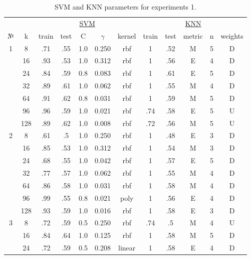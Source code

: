 \begin{table}
\centering
\caption{SVM and KNN parameters for experiments 1.}
\label{tab:params_1_svm_knn}
\begin{tabular}{|c|c|ccccc||ccccc|}\hline
& & \multicolumn{5}{c||}{\underline{SVM}} & \multicolumn{5}{c|}{\underline{KNN}}\\
№ &   k & train & test &   C & $\gamma$ & kernel & train & test & metric & n & weights \\\hline
1 &   8 &   .71 &  .55 & 1.0 &    0.250 &    rbf &     1 &  .52 &      M & 5 &       D \\
  &  16 &   .93 &  .53 & 1.0 &    0.312 &    rbf &     1 &  .56 &      E & 4 &       D \\
  &  24 &   .84 &  .59 & 0.8 &    0.083 &    rbf &     1 &  .61 &      E & 5 &       D \\
  &  32 &   .89 &  .61 & 1.0 &    0.062 &    rbf &     1 &  .55 &      M & 4 &       D \\
  &  64 &   .91 &  .62 & 0.8 &    0.031 &    rbf &     1 &  .59 &      M & 5 &       D \\
  &  96 &   .96 &  .59 & 1.0 &    0.021 &    rbf &   .74 &  .58 &      E & 5 &       U \\
  & 128 &   .89 &  .62 & 1.0 &    0.008 &    rbf &   .72 &  .56 &      M & 5 &       U \\\hline
2 &   8 &   .61 &   .5 & 1.0 &    0.250 &    rbf &     1 &  .48 &      E & 3 &       D \\
  &  16 &   .85 &  .53 & 1.0 &    0.312 &    rbf &     1 &  .54 &      M & 3 &       D \\
  &  24 &   .68 &  .55 & 1.0 &    0.042 &    rbf &     1 &  .57 &      E & 5 &       D \\
  &  32 &   .77 &  .57 & 1.0 &    0.062 &    rbf &     1 &  .55 &      M & 4 &       D \\
  &  64 &   .86 &  .58 & 1.0 &    0.031 &    rbf &     1 &  .58 &      M & 4 &       D \\
  &  96 &   .99 &  .55 & 0.8 &    0.021 &   poly &     1 &  .56 &      E & 4 &       D \\
  & 128 &   .93 &  .59 & 1.0 &    0.016 &    rbf &     1 &  .58 &      E & 3 &       D \\\hline
3 &   8 &   .72 &  .59 & 0.5 &    0.250 &    rbf &   .74 &   .5 &      M & 4 &       U \\
  &  16 &   .84 &  .64 & 1.0 &    0.125 &    rbf &     1 &  .58 &      M & 5 &       D \\
  &  24 &   .72 &  .59 & 0.5 &    0.208 & linear &     1 &  .58 &      E & 4 &       D \\

\end{tabular}
\end{table}
